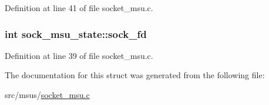 Definition at line 41 of file socket\-\_\-msu.\-c.

\hypertarget{structsock__msu__state_a7621ea37a55e4419bd2e35da3be10ae3}{
\subsubsection[{sock\-\_\-fd}]{\setlength{\rightskip}{0pt plus 5cm}int sock\-\_\-msu\-\_\-state\-::sock\-\_\-fd}}\label{structsock__msu__state_a7621ea37a55e4419bd2e35da3be10ae3}


Definition at line 39 of file socket\-\_\-msu.\-c.



The documentation for this struct was generated from the following file\-:\begin{DoxyCompactItemize}
\item 
src/msus/\hyperlink{socket__msu_8c}{socket\-\_\-msu.\-c}\end{DoxyCompactItemize}
